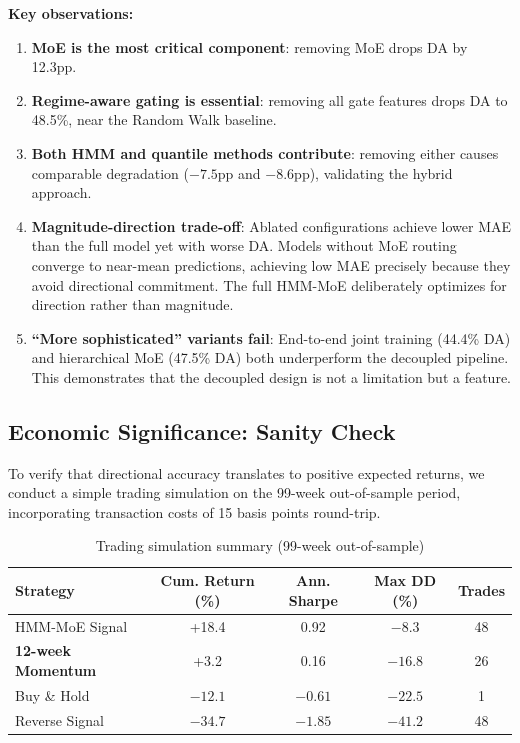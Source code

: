 \documentclass[3p,times]{elsarticle}
\begin{document}
\textbf{Key observations:}

\begin{enumerate}
\item \textbf{MoE is the most critical component}: removing MoE drops DA by 12.3pp.

\item \textbf{Regime-aware gating is essential}: removing all gate features drops DA to 48.5\%, near the Random Walk baseline.

\item \textbf{Both HMM and quantile methods contribute}: removing either causes comparable degradation ($-7.5$pp and $-8.6$pp), validating the hybrid approach.

\item \textbf{Magnitude-direction trade-off}: Ablated configurations achieve lower MAE than the full model yet with worse DA. Models without MoE routing converge to near-mean predictions, achieving low MAE precisely because they avoid directional commitment. The full HMM-MoE deliberately optimizes for direction rather than magnitude.

\item \textbf{``More sophisticated'' variants fail}: End-to-end joint training (44.4\% DA) and hierarchical MoE (47.5\% DA) both underperform the decoupled pipeline. This demonstrates that the decoupled design is not a limitation but a feature.
\end{enumerate}

\subsection{Economic Significance: Sanity Check}

To verify that directional accuracy translates to positive expected returns, we conduct a simple trading simulation on the 99-week out-of-sample period, incorporating transaction costs of 15 basis points round-trip.

\begin{table}[htbp]
\centering
\caption{Trading simulation summary (99-week out-of-sample)}
\label{tab:trading}
\begin{tabular}{lcccc}
\toprule
Strategy & Cum. Return (\%) & Ann. Sharpe & Max DD (\%) & Trades \\
\midrule
HMM-MoE Signal & +18.4 & 0.92 & $-8.3$ & 48 \\
\textbf{12-week Momentum} & +3.2 & 0.16 & $-16.8$ & 26 \\
Buy \& Hold & $-12.1$ & $-0.61$ & $-22.5$ & 1 \\
Reverse Signal & $-34.7$ & $-1.85$ & $-41.2$ & 48 \\
\bottomrule
\end{tabular}
\end{table}
\end{document}
